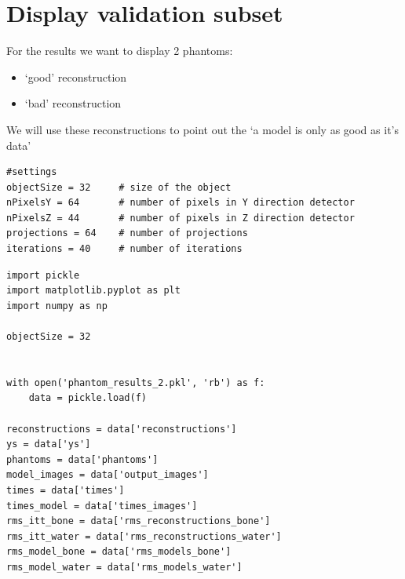 \section{Display validation subset}

For the results we want to display 2 phantoms:

\begin{itemize}
\item `good' reconstruction
\item `bad' reconstruction
\end{itemize}

We will use these reconstructions to point out the `a model is only as good as it's data'

\begin{verbatim}
#settings
objectSize = 32     # size of the object
nPixelsY = 64       # number of pixels in Y direction detector
nPixelsZ = 44       # number of pixels in Z direction detector
projections = 64    # number of projections
iterations = 40     # number of iterations
\end{verbatim}

\begin{verbatim}
import pickle 
import matplotlib.pyplot as plt
import numpy as np

objectSize = 32


with open('phantom_results_2.pkl', 'rb') as f:
    data = pickle.load(f)

reconstructions = data['reconstructions']
ys = data['ys']
phantoms = data['phantoms']
model_images = data['output_images']
times = data['times']
times_model = data['times_images']
rms_itt_bone = data['rms_reconstructions_bone']
rms_itt_water = data['rms_reconstructions_water']
rms_model_bone = data['rms_models_bone']
rms_model_water = data['rms_models_water']
\end{verbatim}


